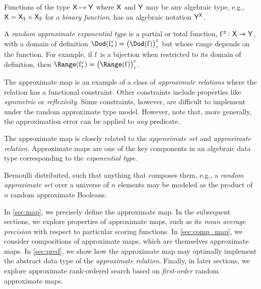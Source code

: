 \documentclass[11pt,final,hidelinks]{article}
\begin{document}
Functions of the type $\Set{X} \mapsto \Set{Y}$ where $\Set{X}$ and $\Set{Y}$ may be any algebraic type, e.g., $\Set{X} = \Set{X}[1] \times \Set{X}[2]$ for a \emph{binary function}, has an algebraic notation $\Set{Y}^{\Set{X}}$.

A \emph{random approximate exponential type} is a partial or total function, $\APFun{f} \colon \Set{X} \pfun \Set{Y}$, with a domain of definition $\Dod(\APFun{f}[\tprate][\fprate]) = \ASet{\left(\Dod(\Fun{f})\right)}[\tprate][\fprate]$ but whose range depends on the function.
For example, if $\PFun{f}$ is a bijection when restricted to its domain of definition, then $\Range\!\left(\APFun{f}[\tprate][\fprate]\right) = \ASet{\left(\Range(\Fun{f})\right)}[\tprate][\fprate]$.

The approximate map is an example of a class of \emph{approximate relations} where the relation has a functional constraint.
Other constraints include properties like \emph{symmetric} or \emph{reflexivity}.
Some constraints, however, are difficult to implement under the random approximate type model.
However, note that, more generally, the approximation error can be applied to \emph{any} predicate.





The approximate map is closely related to the \emph{approximate set}\cite{aset} and \emph{approximate relation}\cite{arelation}.
Approximate maps are one of the key components in an algebraic data type corresponding to the \emph{exponential type}.


Bernoulli distributed, such that anything that composes them, e.g., a \emph{random approximate set} over a universe of $n$ elements may be modeled as the product of $n$ random approximate Booleans.



In \cref{sec:map}, we precisely define the approximate map.
In the subsequent sections, we explore properties of approximate maps, such as its \emph{mean average precision} with respect to particular scoring functions.
In \cref{sec:comp_map}, we consider compositions of approximate maps, which are themselves approximate maps.
In \cref{sec:pred}, we show how the approximate map may optimally implement the abstract data type of the \emph{approximate relation}.
Finally, in later sections, we explore approximate rank-ordered search based on \emph{first-order} random approximate maps.
\end{document}
